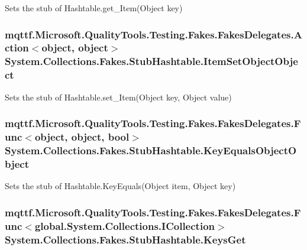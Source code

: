 Sets the stub of Hashtable.\-get\-\_\-\-Item(\-Object key)

\hypertarget{class_system_1_1_collections_1_1_fakes_1_1_stub_hashtable_a237d4dbe947eff9deb15eaeca2fd14fa}{
\subsubsection[{Item\-Set\-Object\-Object}]{\setlength{\rightskip}{0pt plus 5cm}mqttf.\-Microsoft.\-Quality\-Tools.\-Testing.\-Fakes.\-Fakes\-Delegates.\-Action$<$object, object$>$ System.\-Collections.\-Fakes.\-Stub\-Hashtable.\-Item\-Set\-Object\-Object}}\label{class_system_1_1_collections_1_1_fakes_1_1_stub_hashtable_a237d4dbe947eff9deb15eaeca2fd14fa}


Sets the stub of Hashtable.\-set\-\_\-\-Item(\-Object key, Object value)

\hypertarget{class_system_1_1_collections_1_1_fakes_1_1_stub_hashtable_ac44829c2c1319a0193bb3b1ee9af7999}{
\subsubsection[{Key\-Equals\-Object\-Object}]{\setlength{\rightskip}{0pt plus 5cm}mqttf.\-Microsoft.\-Quality\-Tools.\-Testing.\-Fakes.\-Fakes\-Delegates.\-Func$<$object, object, bool$>$ System.\-Collections.\-Fakes.\-Stub\-Hashtable.\-Key\-Equals\-Object\-Object}}\label{class_system_1_1_collections_1_1_fakes_1_1_stub_hashtable_ac44829c2c1319a0193bb3b1ee9af7999}


Sets the stub of Hashtable.\-Key\-Equals(\-Object item, Object key)

\hypertarget{class_system_1_1_collections_1_1_fakes_1_1_stub_hashtable_a17a8f0b017f99165713d0ce1dfb44385}{
\subsubsection[{Keys\-Get}]{\setlength{\rightskip}{0pt plus 5cm}mqttf.\-Microsoft.\-Quality\-Tools.\-Testing.\-Fakes.\-Fakes\-Delegates.\-Func$<$global.\-System.\-Collections.\-I\-Collection$>$ System.\-Collections.\-Fakes.\-Stub\-Hashtable.\-Keys\-Get}}\label{class_system_1_1_collections_1_1_fakes_1_1_stub_hashtable_a17a8f0b017f99165713d0ce1dfb44385}


